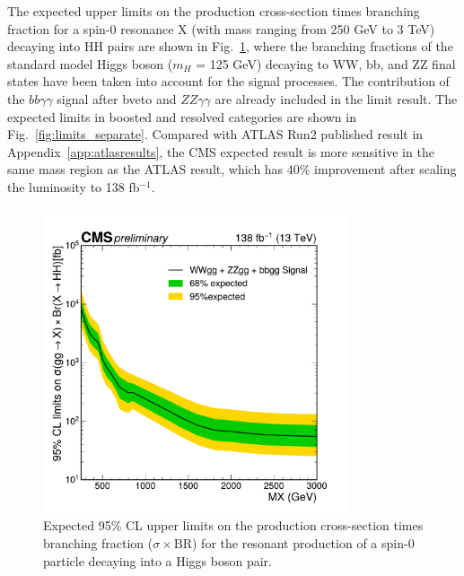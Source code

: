 The expected upper limits on the production cross-section times branching fraction for a spin-0 resonance X (with mass ranging from 250 GeV to 3 TeV)
decaying into HH pairs are shown in Fig.~\ref{fig:limits_spin0}, where the branching fractions of the standard model
Higgs boson ($m_{H}$ = 125 GeV) decaying to WW, bb, and ZZ final states have been taken into account for the signal processes.
The contribution of the $bb\gamma\gamma$ signal after bveto and $ZZ\gamma\gamma$ are already included in the limit result.
The expected limits in boosted and resolved categories are shown in Fig.~\ref{fig:limits_separate}.
Compared with ATLAS Run2 published result in Appendix~\ref{app:atlasresults},
the CMS expected result is more sensitive in the same mass region as the ATLAS result, which has 40\% improvement after scaling the luminosity to 138 fb$^{-1}$.
\begin{figure}[htbp!]
  \centering
  \includegraphics[width=0.8\textwidth]{figures/Limit/Run2_HH_limit.pdf}%
  \caption{Expected 95\% CL upper limits on the production cross-section times branching fraction ($\sigma \times \text{BR}$) for the resonant production of a spin-0 particle decaying into a Higgs boson pair.}
  \label{fig:limits_spin0}
\end{figure}

